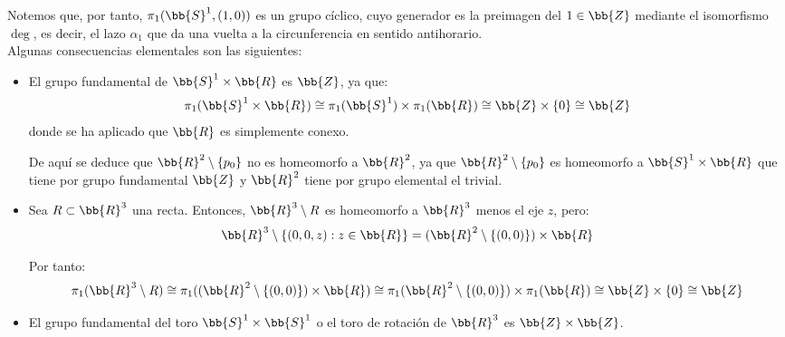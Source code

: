 Notemos que, por tanto, $\pi_1(\bb{S}^1, (1,0))$ es un grupo cíclico, cuyo generador es la preimagen del $1\in \bb{Z}$ mediante el isomorfismo $\deg$, es decir, el lazo $\alpha_1$ que da una vuelta a la circunferencia en sentido antihorario.\\


Algunas consecuencias elementales son las siguientes:
\begin{itemize}
    \item El grupo fundamental de $\bb{S}^1\times \bb{R}$ es $\bb{Z}$, ya que:
    \begin{gather*}
        \pi_1(\bb{S}^1\times \bb{R}) \cong \pi_1(\bb{S}^1)\times \pi_1(\bb{R}) \cong \bb{Z}\times \{0\} \cong \bb{Z}
    \end{gather*}
    donde se ha aplicado que $\bb{R}$ es simplemente conexo.
    
    De aquí se deduce que $\bb{R}^2 \setminus \{p_0\}$ no es homeomorfo a $\bb{R}^2$, ya que $\bb{R}^2 \setminus \{p_0\}$ es homeomorfo a $\bb{S}^1\times \bb{R}$ que tiene por grupo fundamental $\bb{Z}$ y $\bb{R}^2$ tiene por grupo elemental el trivial.
    
    \item Sea $R\subset \bb{R}^3$ una recta. Entonces, $\bb{R}^3\setminus R$ es homeomorfo a $\bb{R}^3$ menos el eje $z$, pero:
    \begin{gather*}
        \bb{R}^3\setminus \{(0,0,z): z\in \bb{R}\} = (\bb{R}^2\setminus \{(0,0)\})\times \bb{R}
    \end{gather*}

    Por tanto:
    $$\pi_1(\bb{R}^3\setminus R) \cong \pi_1((\bb{R}^2\setminus \{(0,0)\})\times \bb{R}) \cong \pi_1(\bb{R}^2\setminus \{(0,0)\})\times \pi_1(\bb{R}) \cong \bb{Z}\times \{0\} \cong \bb{Z}$$
    
    \item El grupo fundamental del toro $\bb{S}^1 \times \bb{S}^1$ o el toro de rotación de $\bb{R}^3$ es $\bb{Z}\times \bb{Z}$.
\end{itemize}


